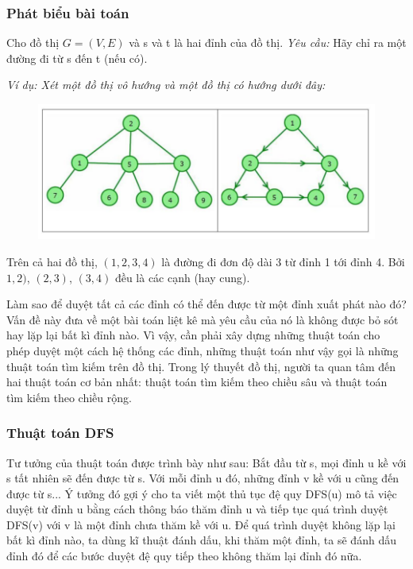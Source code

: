 \documentclass[a4paper,10pt]{article}
\begin{document}
\subsubsection{Phát biểu bài toán}
Cho đồ thị $G = (V, E)$ và s và t là hai đỉnh của đồ thị.
\emph{Yêu cầu: } Hãy chỉ ra một đường đi từ s đến t (nếu có).

\emph{Ví dụ: Xét một đồ thị vô hướng và một đồ thị có hướng dưới đây:}
\begin{figure}[h!]
  \centering
\includegraphics[scale=0.5]{images/pic3.png}
\end{figure}

Trên cả hai đồ thị, $(1, 2, 3, 4)$ là đường đi đơn độ dài 3 từ đỉnh 1 tới đỉnh 4. Bởi $1, 2)$, $(2, 3)$, $(3, 4)$ đều là các cạnh (hay cung).

Làm sao để duyệt tất cả các đỉnh có thể đến được từ một đỉnh xuất phát nào đó? Vấn đề này đưa về một bài toán liệt kê mà yêu cầu của nó là không được bỏ sót hay lặp lại bất kì đỉnh nào. Vì vậy, cần phải xây dựng những thuật toán cho phép duyệt một cách hệ thống các đỉnh, những thuật toán như vậy gọi là những thuật toán tìm kiếm trên đồ thị. Trong lý thuyết đồ thị, người ta quan tâm đến hai thuật toán cơ bản nhất: thuật toán tìm kiếm theo chiều sâu và thuật toán tìm kiếm theo chiều rộng.

\subsubsection{Thuật toán DFS}
Tư tưởng của thuật toán được trình bày như sau: Bắt đầu từ s, mọi đỉnh u kề với s tất nhiên sẽ đến được từ s. Với mỗi đỉnh u đó, những đỉnh v kề với u cũng đến được từ s... Ý tưởng đó gợi ý cho ta viết một thủ tục đệ quy DFS(u) mô tả việc duyệt từ đỉnh u bằng cách thông báo thăm đỉnh u và tiếp tục quá trình duyệt DFS(v) với v là một đỉnh chưa thăm kề với u. Để quá trình duyệt không lặp lại bất kì đỉnh nào, ta dùng kĩ thuật đánh dấu, khi thăm một đỉnh, ta sẽ đánh dấu đỉnh đó để các bước duyệt đệ quy tiếp theo không thăm lại đỉnh đó nữa.
\end{document}
